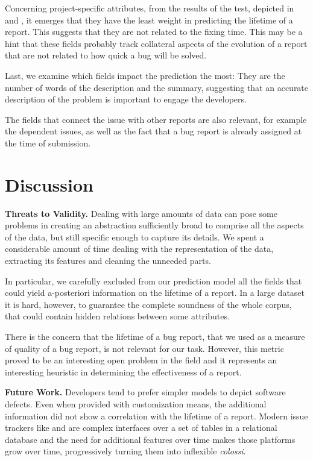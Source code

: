 Concerning project-specific attributes, from the results of the test, depicted in  and , it emerges that they have the least weight in predicting the lifetime of a report. This suggests that they are not related to the fixing time. This may be a hint that these fields probably track collateral aspects of the evolution of a report that are not related to how quick a bug will be solved.

Last, we examine which fields impact the prediction the most: They are the number of words of the description and the summary, suggesting that an accurate description of the problem is important to engage the developers. 

The fields that connect the issue with other reports are also relevant, for example the dependent issues, as well as the fact that a bug report is already assigned at the time of submission.


\section{Discussion} \label{sec:discussion}

{\bfseries Threats to Validity.} Dealing with large amounts of data can pose some problems in creating an abstraction sufficiently broad to comprise all the aspects of the data, but still specific enough to capture its details. We spent a considerable amount of time dealing with the representation of the data, extracting its features and cleaning the unneeded parts. 

In particular, we carefully excluded from our prediction model all the fields that could yield a-posteriori information on the lifetime of a report. In a large dataset it is hard, however, to guarantee the complete soundness of the whole corpus, that could contain hidden relations between some attributes.

There is the concern that the lifetime of a bug report, that we used as a measure of quality of a bug report, is not relevant for our task. However, this metric proved to be an interesting open problem in the field and it represents an interesting heuristic in determining the effectiveness of a report.

{\bfseries Future Work.} Developers tend to prefer simpler models to depict software defects. Even when provided with customization means, the additional information did not show a correlation with the lifetime of a report. Modern issue trackers like \jira and \bzilla are complex interfaces over a set of tables in a relational database and the need for additional features over time makes those platforms grow over time, progressively turning them into inflexible \emph{colossi}. 

